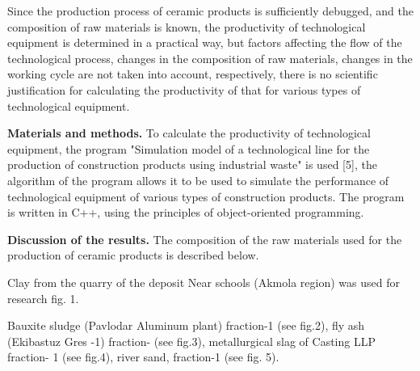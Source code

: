 \begin{multicols}{2}
Since the production process of ceramic products is sufficiently
debugged, and the composition of raw materials is known, the
productivity of technological equipment is determined in a practical
way, but factors affecting the flow of the technological process,
changes in the composition of raw materials, changes in the working
cycle are not taken into account, respectively, there is no scientific
justification for calculating the productivity of that for various types
of technological equipment.

{\bfseries Materials and methods.} To calculate the productivity of
technological equipment, the program "Simulation model of a
technological line for the production of construction products using
industrial waste" is used {[}5{]}, the algorithm of the program allows
it to be used to simulate the performance of technological equipment of
various types of construction products. The program is written in C++,
using the principles of object-oriented programming.

{\bfseries Discussion of the results.} The composition of the raw materials
used for the production of ceramic products is described below.

Clay from the quarry of the deposit Near schools (Akmola region) was
used for research fig. 1.

Bauxite sludge (Pavlodar Aluminum plant) fraction-1 (see fig.2), fly ash
(Ekibastuz Gres -1) fraction- (see fig.3), metallurgical slag of Casting
LLP fraction- 1 (see fig.4), river sand, fraction-1 (see fig. 5).
\end{multicols}

